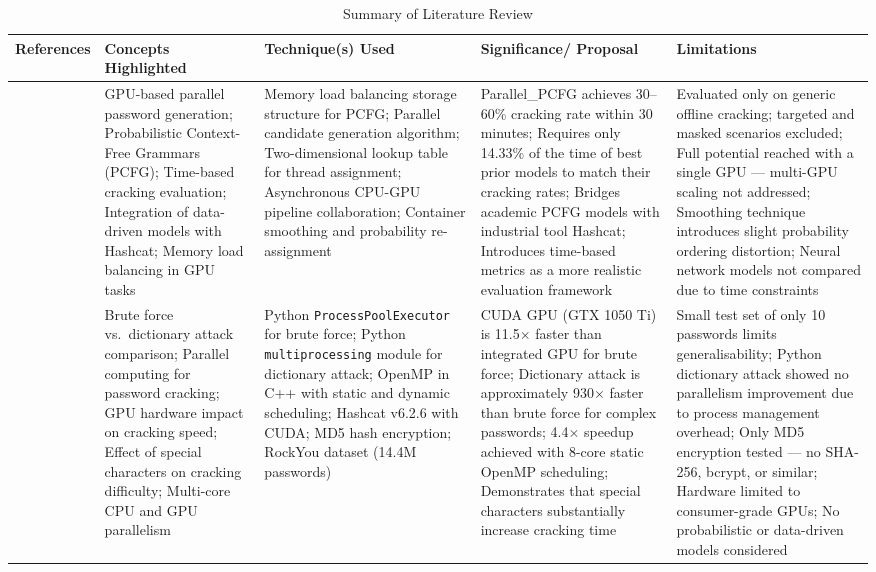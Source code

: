 \documentclass[12pt,a4paper]{article}
\begin{document}
	
	\begin{longtable}[htp]{|p{2cm}|p{2.5cm}|p{2.5cm}|p{3cm}|p{3.5cm}|}
\caption{Summary of Literature Review}
\label{Table1}
\hline \textbf{References} & \textbf{Concepts Highlighted} & \textbf{Technique(s) Used} & \textbf{Significance/ Proposal} & \textbf{Limitations} \\

\hline \cite{xu_using_2025} & GPU-based parallel password generation; Probabilistic Context-Free Grammars (PCFG); Time-based cracking evaluation; Integration of data-driven models with Hashcat; Memory load balancing in GPU tasks & Memory load balancing storage structure for PCFG; Parallel candidate generation algorithm; Two-dimensional lookup table for thread assignment; Asynchronous CPU-GPU pipeline collaboration; Container smoothing and probability re-assignment & Parallel\_PCFG achieves 30--60\% cracking rate within 30 minutes; Requires only 14.33\% of the time of best prior models to match their cracking rates; Bridges academic PCFG models with industrial tool Hashcat; Introduces time-based metrics as a more realistic evaluation framework & Evaluated only on generic offline cracking; targeted and masked scenarios excluded; Full potential reached with a single GPU --- multi-GPU scaling not addressed; Smoothing technique introduces slight probability ordering distortion; Neural network models not compared due to time constraints \\

\hline \cite{alkhwaja_password_2023} & Brute force vs.\ dictionary attack comparison; Parallel computing for password cracking; GPU hardware impact on cracking speed; Effect of special characters on cracking difficulty; Multi-core CPU and GPU parallelism & Python \texttt{ProcessPoolExecutor} for brute force; Python \texttt{multiprocessing} module for dictionary attack; OpenMP in C++ with static and dynamic scheduling; Hashcat v6.2.6 with CUDA; MD5 hash encryption; RockYou dataset (14.4M passwords) & CUDA GPU (GTX 1050 Ti) is 11.5$\times$ faster than integrated GPU for brute force; Dictionary attack is approximately 930$\times$ faster than brute force for complex passwords; 4.4$\times$ speedup achieved with 8-core static OpenMP scheduling; Demonstrates that special characters substantially increase cracking time & Small test set of only 10 passwords limits generalisability; Python dictionary attack showed no parallelism improvement due to process management overhead; Only MD5 encryption tested --- no SHA-256, bcrypt, or similar; Hardware limited to consumer-grade GPUs; No probabilistic or data-driven models considered \\


\end{longtable}
\end{document}
